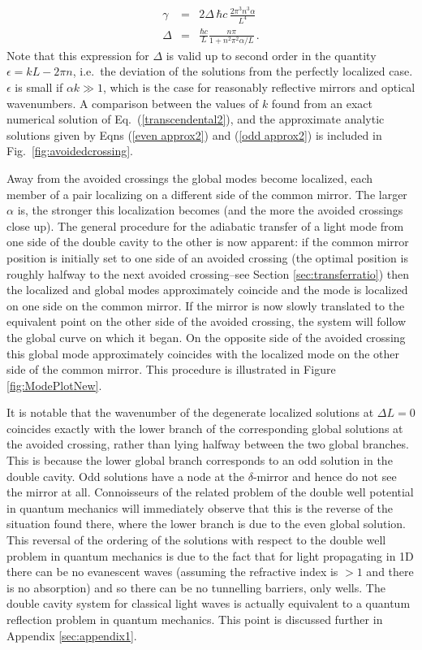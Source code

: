 \documentclass[twocolumn,english,pra,aps,superscriptaddress,floatfix]{revtex4-1}
\begin{document}
\begin{eqnarray}
\gamma & = & 2 \Delta \, \hbar c \,   \frac{2\pi^{3}n^{3}\alpha}{L^4} \label{eq:gamma} \\
\Delta & = & \frac{\hbar c}{L}\frac{n \pi}{1+n^2 \pi^2 \alpha/L  } \, . \label{Delta approx}
\end{eqnarray}
Note that this expression for $\Delta$ is valid up to second order in the quantity $\epsilon=kL-2 \pi n$, i.e.\ the deviation of the solutions from the perfectly localized case. $\epsilon$ is small if $\alpha k \gg 1$, which is the case for reasonably reflective mirrors and optical wavenumbers. 
 A comparison between the values of $k$ found from an exact numerical solution of Eq.\  (\ref{transcendental2}), and the approximate analytic solutions given by Eqns (\ref{even approx2}) and (\ref{odd approx2}) is included in Fig.\ \ref{fig:avoidedcrossing}.

Away from the avoided crossings the global modes become localized, each member of a pair
localizing on a different side of the common mirror. The larger $\alpha$ is, the stronger this localization becomes (and the more the avoided crossings close up). The general procedure for the adiabatic transfer of a light mode from one side of the double cavity to the other is now apparent: if the common mirror position is initially set to one side of an avoided crossing (the optimal position is roughly halfway to the next avoided crossing--see Section \ref{sec:transferratio}) then the localized and global modes approximately coincide and the mode is localized on one side on the common mirror.  If the mirror is now slowly translated to the equivalent point on the other side of the avoided crossing, the system will follow the global curve on which it began. On the opposite side of the avoided crossing this global mode approximately coincides with the  localized mode on the other side of the common mirror. This procedure is illustrated in Figure \ref{fig:ModePlotNew}.

It is notable that the wavenumber of the degenerate localized solutions at $\Delta L=0$ coincides exactly with the lower branch of the corresponding global solutions at the avoided crossing, rather than lying halfway between the two global branches.  This is because the lower global branch corresponds to an odd solution in the double cavity. Odd solutions have a node at the $\delta$-mirror and hence do not see the mirror at all. Connoisseurs of the related problem of the double well potential in quantum mechanics \cite{landau&lifshitz} will immediately observe that this is the reverse of the situation found there, where the lower branch is due to the even global solution. This reversal  of the ordering of the solutions with respect to the double well problem in quantum mechanics is due to the fact that for light propagating in 1D there can be no evanescent waves (assuming the refractive index is $> 1$ and there is no absorption) and so there can be no tunnelling barriers, only wells. The double cavity system for classical light waves is actually equivalent to a quantum reflection problem in quantum mechanics. This point is discussed further in Appendix \ref{sec:appendix1}. 
\end{document}
